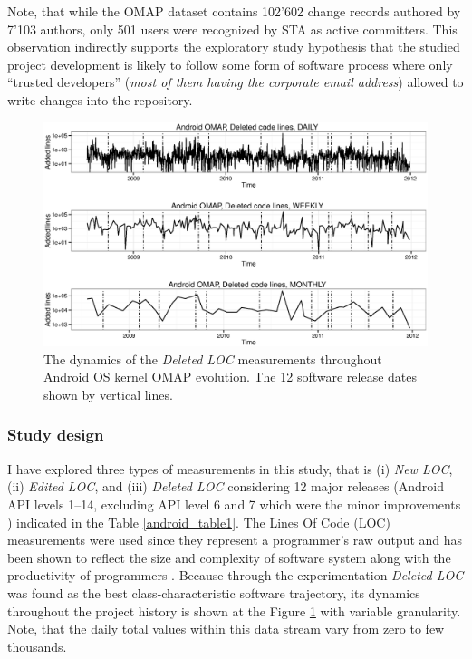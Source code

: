 Note, that while the OMAP dataset contains 102'602 change records authored by 7'103 authors, only 501 users were recognized by STA as active committers. This observation indirectly supports the exploratory study hypothesis that the studied project development is likely to follow some form of software process where only ``trusted developers'' (\textit{most of them having the corporate email address}) allowed to write changes into the repository.

\begin{figure}[t]
   \centering
   \includegraphics[width=145mm]{figures/omap_removed_lines_plot.eps}
   \caption{The dynamics of the \textit{Deleted LOC} measurements throughout Android OS kernel OMAP evolution. 
   The 12 software release dates shown by vertical lines.}
   \label{fig:OMAP_dynamics}
\end{figure}

\subsubsection{Study design}
I have explored three types of measurements in this study, that is (i) \textit{New LOC}, (ii) \textit{Edited LOC}, and (iii) \textit{Deleted LOC} considering 12 major releases (Android API levels 1--14, excluding API level 6 and 7 which were the minor improvements \cite{api-levels}) indicated in the Table \ref{android_table1}. The Lines Of Code (LOC) measurements were used since they represent a programmer's raw output and has been shown to reflect the size and complexity of software system along with the productivity of programmers  \cite{citeulike:341464} \cite{citeulike:13410945} \cite{citeulike:13410947}. Because through the experimentation \textit{Deleted LOC} was found as the best class-characteristic software trajectory, its dynamics throughout the project history is shown at the Figure \ref{fig:OMAP_dynamics} with variable granularity. Note, that the daily total values within this data stream vary from zero to few thousands.

